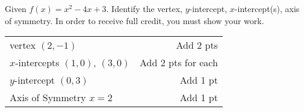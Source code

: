 

{
	Given $f(x)=x^2-4x+3$. Identify the vertex,  $y$-intercept, $x$-intercept(s), axis of symmetry. In order to receive full credit, you must show your work.}
{
	\begin{tabular}{l r}
	vertex $(2, -1)$ & Add 2 pts\\
	$x$-intercepts $(1,0)$, $(3, 0)$ & Add 2 pts for each\\
	$y$-intercept $(0,3)$ & Add 1 pt\\
	Axis of Symmetry  $x=2$ & Add 1 pt\\
	\end{tabular}
}
